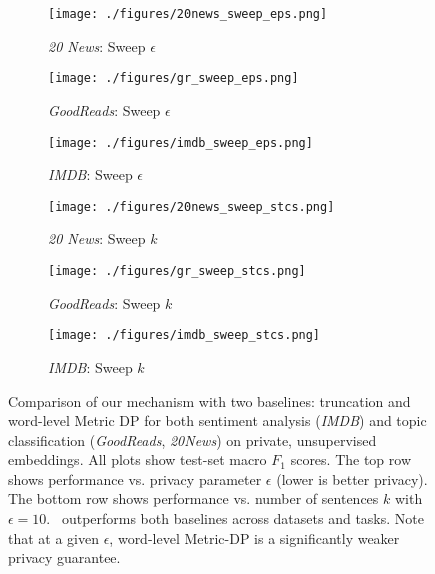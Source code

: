 \begin{figure*}[ht]
\centering 
   \begin{subfigure}[b]{0.30\linewidth}
       \centering
       \texttt{[image: ./figures/20news\_sweep\_eps.png]}
      \vspace{-0.15cm}
       \caption{\textit{20 News}: Sweep $\epsilon$}
       \label{fig:eps:tnews}
    \end{subfigure}%
    \begin{subfigure}[b]{0.30\linewidth}
       \centering
       \texttt{[image: ./figures/gr\_sweep\_eps.png]}
      \vspace{-0.15cm}
       \caption{\textit{GoodReads}: Sweep $\epsilon$}
       \label{fig:eps:gr}
    \end{subfigure}%
    \begin{subfigure}[b]{0.30\linewidth}
       \centering
       \texttt{[image: ./figures/imdb\_sweep\_eps.png]}
      \vspace{-0.15cm}
       \caption{\textit{IMDB}: Sweep $\epsilon$}
       \label{fig:eps:imdb}
    \end{subfigure}%
    \hfill
    \begin{subfigure}[b]{0.30\linewidth}
       \centering
       \texttt{[image: ./figures/20news\_sweep\_stcs.png]}
      \vspace{-0.15cm}
       \caption{\textit{20 News}: Sweep $k$}
       \label{fig:k:tnews}
    \end{subfigure}%
    \begin{subfigure}[b]{0.30\linewidth}
       \centering
       \texttt{[image: ./figures/gr\_sweep\_stcs.png]}
      \vspace{-0.15cm}
       \caption{\textit{GoodReads}: Sweep $k$}
       \label{fig:k:gr}
    \end{subfigure}%
    \begin{subfigure}[b]{0.30\linewidth}
       \centering
       \texttt{[image: ./figures/imdb\_sweep\_stcs.png]}
      \vspace{-0.15cm}
       \caption{\textit{IMDB}: Sweep $k$}
       \label{fig:k:imdb}
    \end{subfigure}%
    \caption[Comparison of our mechanism with two baselines: truncation \cite{clifton} and word-level Metric DP \cite{metricdp} for both sentiment analysis (\emph{IMDB}) and topic classification (\emph{GoodReads}, \emph{20News}) on private, unsupervised embeddings.]{Comparison of our mechanism with two baselines: truncation \cite{clifton} and word-level Metric DP \cite{metricdp} for both sentiment analysis (\emph{IMDB}) and topic classification (\emph{GoodReads}, \emph{20News}) on private, unsupervised embeddings. All plots show test-set macro $F_1$ scores. The top row shows performance vs. privacy parameter $\epsilon$ (lower is better privacy). The bottom row shows performance vs. number of sentences $k$ with $\epsilon = 10$. \technique\ outperforms both baselines across datasets and tasks. Note that at a given $\epsilon$, word-level Metric-DP is a significantly weaker privacy guarantee.}
\end{figure*}
